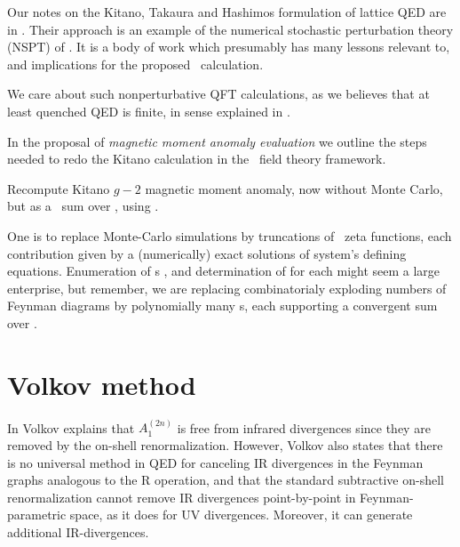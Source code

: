 Our notes on the Kitano, Takaura and Hashimos formulation of lattice QED are in
.
Their approach is an example of the numerical stochastic perturbation theory (NSPT)
of .
It is a  body of work which presumably has many
lessons relevant to, and implications for the proposed \dft\ calculation.

We care about such nonperturbative QFT calculations, as we believes 
that at least quenched QED is finite, in sense explained in .

In the proposal of  {\em {\Dft} magnetic moment anomaly evaluation}
we outline the steps needed to redo the Kitano calculation
in the \spt\ field theory framework.

Recompute  Kitano {$g-2$} magnetic moment anomaly,
now without Monte Carlo, but as a \detZeta\ sum over {\lsts}, using 
.

One is to replace Monte-Carlo simulations by
truncations of \spt\ zeta functions, each contribution given by a (numerically)
exact solutions of system's defining equations.
Enumeration of {\Blatt}s 
, 
and determination of {\lsts} for each might seem a large enterprise, but remember,
we are replacing combinatorialy exploding numbers of Feynman diagrams 
by polynomially many {\Blatt}s, each supporting a convergent sum over \lsts.


\section{Volkov method}
\label{sect:Volkov}

In  Volkov explains that $A_1^{(2n)}$ is free from
infrared divergences since they are removed by the on-shell
renormalization.
However, Volkov also states that there is no universal method in QED for
canceling IR divergences in the Feynman graphs analogous to the R
operation, and that the standard subtractive on-shell renormalization
cannot remove IR divergences point-by-point in Feynman-parametric space,
as it does for UV divergences. Moreover, it can generate additional
IR-divergences.

